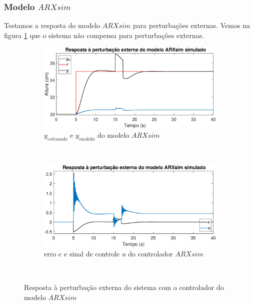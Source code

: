 \subsubsection{Modelo $ARXsim$}

Testamos a resposta do modelo $ARXsim$ para perturbações externas. Vemos na figura \ref{fig:pextsarxsimy} que o sistema não compensa para perturbações externas.

\begin{figure}[htb]
	\centering
	\begin{subfigure}[t]{0.48\textwidth}
		\includegraphics[width=1\linewidth]{pasta1_figuras/pextsarxsimy}
		\caption[$y_{estimado}$ e $y_{medido}$ do modelo $ARX2$]{$y_{estimado}$ e $y_{medido}$ do modelo $ARXsim$}
		\label{fig:pextsarxsimy}
	\end{subfigure}
	~ %
	\begin{subfigure}[t]{0.48\textwidth}
		\includegraphics[width=1\linewidth]{pasta1_figuras/pextsarxsime}
		\caption[erro $e$ e sinal de controle $u$ do controlador $ARX2$]{erro $e$ e sinal de controle $u$ do controlador $ARXsim$}
		\label{fig:pextsarxsime}
	\end{subfigure}
	~ %
	
	\caption{Resposta à perturbação externa do sistema com o controlador do modelo $ARXsim$}\label{fig:pextsarxsim}
\end{figure}




